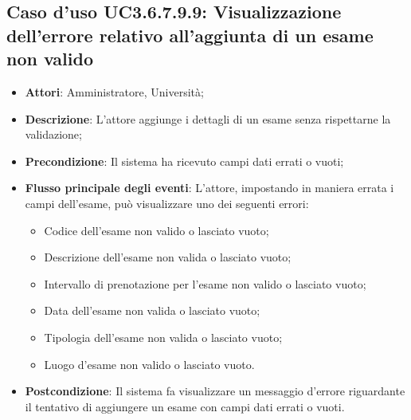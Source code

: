 \subsection{Caso d'uso \texorpdfstring{UC3.6.7.9.9}{UC3.6.7.9.9}: Visualizzazione dell'errore relativo all’aggiunta di un esame non valido}
\begin{itemize}
\item \textbf{Attori}: Amministratore, Università;
\item \textbf{Descrizione}: L'attore aggiunge i dettagli di un esame senza rispettarne la validazione;

\item \textbf{Precondizione}: Il sistema ha ricevuto campi dati errati o vuoti;
\item \textbf{Flusso principale degli eventi}: L'attore, impostando in maniera errata i campi dell'esame, può visualizzare uno dei seguenti errori:
\begin{itemize}
\item Codice dell’esame non valido o lasciato vuoto;
\item Descrizione dell’esame non valida o lasciato vuoto;
\item Intervallo di prenotazione per l’esame non valido o lasciato vuoto;
\item Data dell’esame non valida o lasciato vuoto;
\item Tipologia dell’esame non valida o lasciato vuoto;
\item Luogo d’esame non valido o lasciato vuoto.
\end{itemize}
\item \textbf{Postcondizione}: Il sistema fa visualizzare un messaggio d'errore riguardante il tentativo di aggiungere un esame con campi dati errati o vuoti.

\end{itemize}

